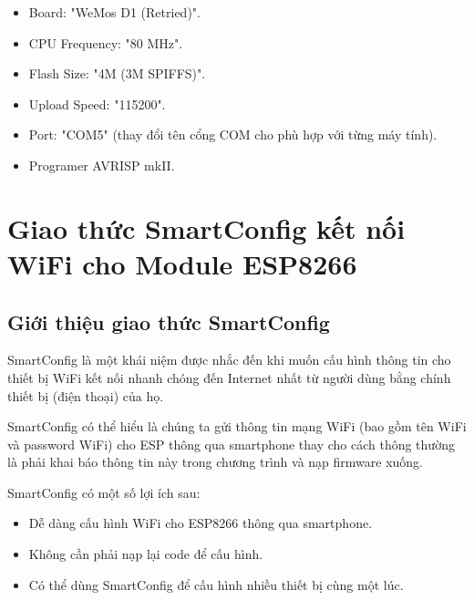 \begin{itemize}
                \begin{itemize}
                    \item Board: "WeMos D1 (Retried)".
                    \item CPU Frequency: "80 MHz".
                    \item Flash Size: "4M (3M SPIFFS)".
                    \item Upload Speed: "115200".
                    \item Port: "COM5" (thay đổi tên cổng COM cho phù hợp với từng máy tính).
                    \item Programer AVRISP mkII.
                \end{itemize}
        \end{itemize}

\section{Giao thức SmartConfig kết nối WiFi cho Module ESP8266}
\subsection{Giới thiệu giao thức SmartConfig}
    SmartConfig là một khái niệm được nhắc đến khi muốn cấu hình thông tin cho thiết bị WiFi kết nối nhanh chóng đến Internet nhất từ người dùng bằng chính thiết bị (điện thoại) của họ.

    SmartConfig có thể hiểu là chúng ta gửi thông tin mạng WiFi (bao gồm tên WiFi và password WiFi) cho ESP thông qua smartphone thay cho cách thông thường là phải khai báo thông tin này trong chương trình và nạp firmware xuống.

    SmartConfig có một số lợi ích sau:
        \begin{itemize}
            \item Dễ dàng cấu hình WiFi cho ESP8266 thông qua smartphone.
            \item Không cần phải nạp lại code để cấu hình.
            \item Có thể dùng SmartConfig để cấu hình nhiều thiết bị cùng một lúc.
        \end{itemize}
